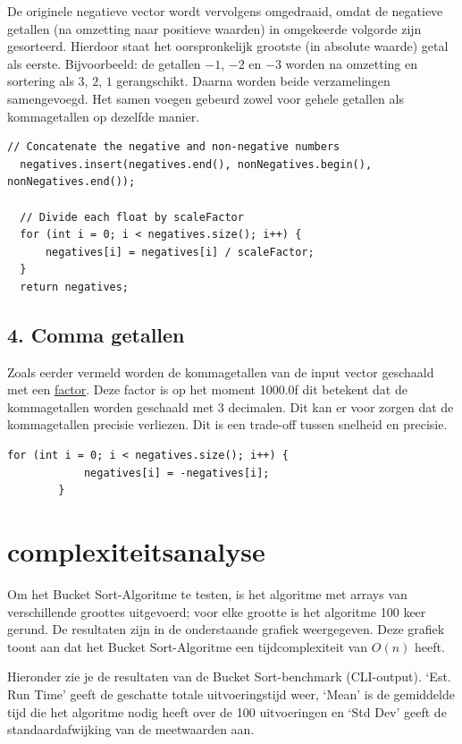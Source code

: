 \documentclass{article}
\begin{document}
De originele negatieve vector wordt vervolgens omgedraaid, 
omdat de negatieve getallen (na omzetting naar positieve waarden) in omgekeerde volgorde zijn gesorteerd. 
Hierdoor staat het oorspronkelijk grootste (in absolute waarde) getal als eerste.  
Bijvoorbeeld: de getallen \(-1\), \(-2\) en \(-3\) worden na omzetting en sortering als \(3\), \(2\), \(1\) gerangschikt. 
Daarna worden beide verzamelingen samengevoegd. Het samen voegen gebeurd zowel voor gehele getallen als kommagetallen op dezelfde manier.
\begin{lstlisting}[caption={getallen samenvoegen}, label={lst:negatives}]
  // Concatenate the negative and non-negative numbers
  negatives.insert(negatives.end(), nonNegatives.begin(), nonNegatives.end());

  // Divide each float by scaleFactor
  for (int i = 0; i < negatives.size(); i++) {
      negatives[i] = negatives[i] / scaleFactor;
  }
  return negatives;  
\end{lstlisting}



\subsection{4. Comma getallen}
Zoals eerder vermeld worden de kommagetallen van de input vector geschaald met een \hyperref[lst:negatives]{factor}. 
Deze factor is op het moment 1000.0f dit betekent dat de kommagetallen worden geschaald met 3 decimalen. 
Dit kan er voor zorgen dat de kommagetallen precisie verliezen. Dit is een trade-off tussen snelheid en precisie.

\begin{lstlisting}[caption={Terug schalen}, label={lst:factor}]
  for (int i = 0; i < negatives.size(); i++) {
            negatives[i] = -negatives[i];
        }
\end{lstlisting}

\newpage
\section{complexiteitsanalyse}
Om het Bucket Sort-Algoritme te testen, is het algoritme met arrays van verschillende groottes uitgevoerd; voor elke grootte is het algoritme 100 keer gerund.  
De resultaten zijn in de onderstaande grafiek weergegeven. Deze grafiek toont aan dat het Bucket Sort-Algoritme een tijdcomplexiteit van \(O(n)\) heeft.

Hieronder zie je de resultaten van de Bucket Sort-benchmark (CLI-output). 
‘Est. Run Time’ geeft de geschatte totale uitvoeringstijd weer, 
‘Mean’ is de gemiddelde tijd die het algoritme nodig heeft over de 100 uitvoeringen en ‘Std Dev’ geeft de standaardafwijking van de meetwaarden aan.
\end{document}
